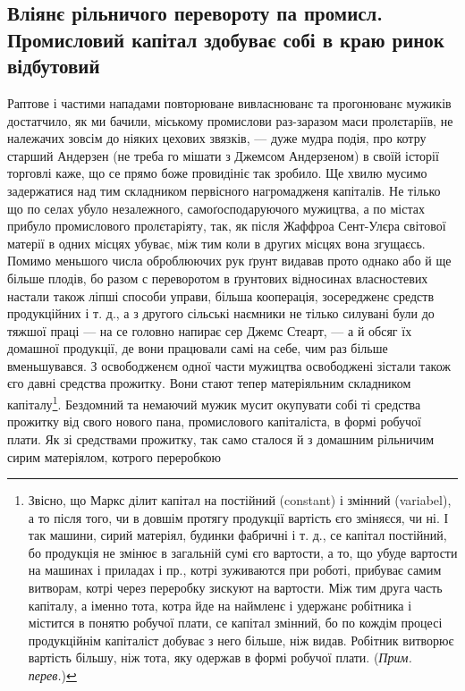 \subsection{Вліянє рільничого перевороту па промисл.
Промисловий капітал здобуває собі в краю ринок
відбутовий}

Раптове і частими нападами повторюване вивласнюванє
та прогонюванє мужиків достатчило, як ми бачили,
міському промислови раз-заразом маси пролєтаріїв, не належачих
зовсім до ніяких цехових звязків, — дуже мудра
подія, про котру старший Андерзен (не треба го мішати
з Джемсом Андерзеном) в своїй історії торговлі каже, що
се прямо боже провидініє так зробило. Ще хвилю мусимо
задержатися над тим складником первісного нагромадженя
капіталів. Не тілько що по селах убуло незалежного, самоґосподаруючого
мужицтва, а по містах прибуло промислового
пролєтаріяту, так, як після Жаффроа Сент-Улєра світової
матерії в одних місцях убуває, між тим коли в других
місцях вона згущаєсь. Помимо меньшого числа оброблюючих
рук ґрунт видавав прото однако або й ще більше
плодів, бо разом с переворотом в ґрунтових відносинах
власностевих настали також ліпші способи управи, більша
кооперація, зосередженє средств продукційних і т. д., а з другого
сільські наємники не тілько силувані були до тяжшої
праці — на се головно напирає сер Джемс Стеарт, —
а й обсяг їх домашної продукції, де вони працювали самі
на себе, чим раз більше вменьшувався. З освободженєм
одної части мужицтва освободжені зістали також єго давні
средства прожитку. Вони стают тепер матеріяльним складником
 капіталу\footnote*{
Звісно, що Маркс ділит капітал на постійний (constant) і змінний
(variabel), а то після того, чи в довшім протягу продукції вартість
єго зміняєся, чи ні. І так машини, сирий матеріял, будинки фабричні
і т. д., се капітал постійний, бо продукція не змінює в загальній сумі
єго вартости, а то, що убуде вартости на машинах і приладах і пр.,
котрі зуживаются при роботі, прибуває самим витворам, котрі через переробку
зискуют на вартости. Між тим друга часть капіталу, а іменно
тота, котра йде на наймленє і удержанє робітника і містится в понятю
робучої плати, се капітал змінний, бо по кождім процесі продукційнім
капіталіст добуває з него більше, ніж видав. Робітник витворює вартість
більшу, ніж тота, яку одержав в формі робучої плати. (\emph{Прим. перев.})
}. Бездомний та немаючий мужик
мусит окупувати собі ті средства прожитку від свого
нового пана, промислового капіталіста, в формі робучої
плати. Як зі средствами прожитку, так само сталося й з домашним
рільничим сирим матеріялом, котрого переробкою
